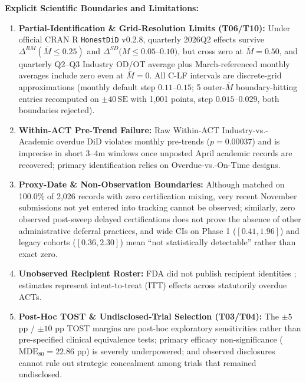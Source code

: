 \documentclass[11pt,letterpaper]{article}
\begin{document}
\textbf{Explicit Scientific Boundaries and Limitations:}
\begin{enumerate}
    \item \textbf{Partial-Identification \& Grid-Resolution Limits (T06/T10):} Under official CRAN R \texttt{HonestDiD} v0.2.8, quarterly 2026Q2 effects survive $\Delta^{RM}(\bar{M}\le 0.25)$ and $\Delta^{SD}(M\le 0.05$--$0.10)$, but cross zero at $\bar{M}=0.50$, and quarterly Q2--Q3 Industry OD/OT average plus March-referenced monthly averages include zero even at $\bar{M}=0$. All C-LF intervals are discrete-grid approximations (monthly default step $0.11$--$0.15$; 5 outer-$\bar{M}$ boundary-hitting entries recomputed on $\pm 40\,\mathrm{SE}$ with 1,001 points, step $0.015$--$0.029$, both boundaries rejected).
    \item \textbf{Within-ACT Pre-Trend Failure:} Raw Within-ACT Industry-vs.-Academic overdue DiD violates monthly pre-trends ($p=0.00037$) and is imprecise in short 3--4m windows once unposted April academic records are recovered; primary identification relies on Overdue-vs.-On-Time designs.
    \item \textbf{Proxy-Date \& Non-Observation Boundaries:} Although  matched  on 100.0\% of 2,026 records with zero certification mixing, very recent November submissions not yet entered into tracking cannot be observed; similarly, zero observed post-sweep delayed certifications does not prove the absence of other administrative deferral practices, and wide CIs on Phase 1 ($[0.41, 1.96]$) and legacy cohorts ($[0.36, 2.30]$) mean ``not statistically detectable'' rather than exact zero.
    \item \textbf{Unobserved Recipient Roster:} FDA did not publish recipient identities \citep{fda2026bulletin}; estimates represent intent-to-treat (ITT) effects across statutorily overdue ACTs.
    \item \textbf{Post-Hoc TOST \& Undisclosed-Trial Selection (T03/T04):} The $\pm 5$ pp / $\pm 10$ pp TOST margins are post-hoc exploratory sensitivities rather than pre-specified clinical equivalence tests; primary efficacy non-significance ($\mathrm{MDE}_{80}=22.86$ pp) is severely underpowered; and observed disclosures cannot rule out strategic concealment among trials that remained undisclosed.
\end{enumerate}
\end{document}
